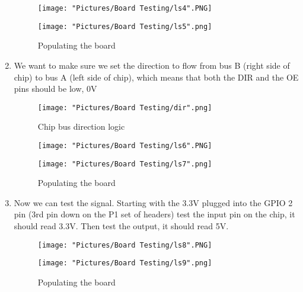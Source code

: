 \documentclass[12pt]{article}
\begin{document}
\begin{enumerate}
\begin{figure}[H]
 	\centering
  	\begin{minipage}[b]{0.45\textwidth}
		\texttt{[image: "Pictures/Board Testing/ls4".PNG]}
  	\end{minipage}
  	\hfill
  	\begin{minipage}[b]{0.45\textwidth}
    		\texttt{[image: "Pictures/Board Testing/ls5".png]}
  	\end{minipage}
	\caption{Populating the board}
	\label{ls2}
\end{figure}

	\item We want to make sure we set the direction to flow from bus B (right side of chip) to bus A (left side of chip), which means that both the DIR and the OE pins should be low, 0V

\begin{figure}[H]
  	\centering
    	\texttt{[image: "Pictures/Board Testing/dir".png]}
 	\caption{Chip bus direction logic}
	\label{dir}
\end{figure}

\begin{figure}[H]
 	\centering
  	\begin{minipage}[b]{0.45\textwidth}
		\texttt{[image: "Pictures/Board Testing/ls6".PNG]}
  	\end{minipage}
  	\hfill
  	\begin{minipage}[b]{0.45\textwidth}
    		\texttt{[image: "Pictures/Board Testing/ls7".png]}
  	\end{minipage}
	\caption{Populating the board}
	\label{ls2}
\end{figure}

	\item Now we can test the signal. Starting with the 3.3V plugged into the GPIO 2 pin (3rd pin down on the P1 set of headers) test the input pin on the chip, it should read 3.3V. Then test the output, it should read 5V.

\begin{figure}[H]
 	\centering
  	\begin{minipage}[b]{0.45\textwidth}
		\texttt{[image: "Pictures/Board Testing/ls8".PNG]}
  	\end{minipage}
  	\hfill
  	\begin{minipage}[b]{0.45\textwidth}
    		\texttt{[image: "Pictures/Board Testing/ls9".png]}
  	\end{minipage}
	\caption{Populating the board}
	\label{ls2}
\end{figure}


\end{enumerate}
\end{document}
